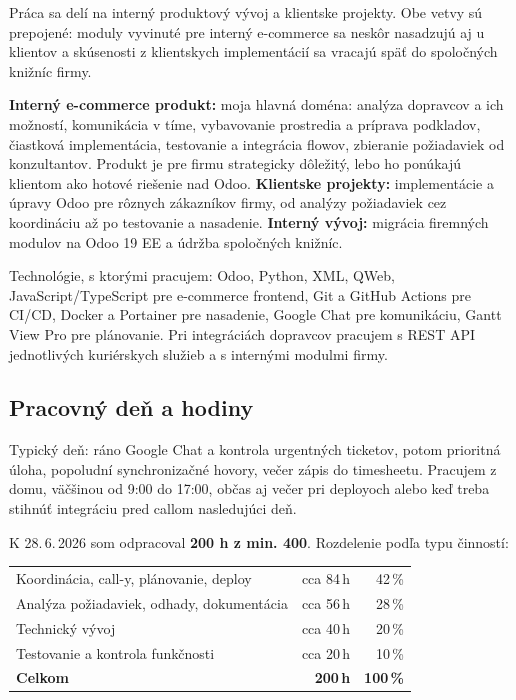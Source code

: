 \documentclass[12pt,a4paper]{article}
\begin{document}
Práca sa delí na interný produktový vývoj a klientske projekty. Obe vetvy sú prepojené: moduly vyvinuté pre interný e-commerce sa neskôr nasadzujú aj u klientov a skúsenosti z klientskych implementácií sa vracajú späť do spoločných knižníc firmy.

\textbf{Interný e-commerce produkt:} moja hlavná doména: analýza dopravcov a ich možností, komunikácia v tíme, vybavovanie prostredia a príprava podkladov, čiastková implementácia, testovanie a integrácia flowov, zbieranie požiadaviek od konzultantov. Produkt je pre firmu strategicky dôležitý, lebo ho ponúkajú klientom ako hotové riešenie nad Odoo. \textbf{Klientske projekty:} implementácie a úpravy Odoo pre rôznych zákazníkov firmy, od analýzy požiadaviek cez koordináciu až po testovanie a nasadenie. \textbf{Interný vývoj:} migrácia firemných modulov na Odoo 19 EE a údržba spoločných knižníc.

Technológie, s ktorými pracujem: Odoo, Python, XML, QWeb, JavaScript/TypeScript pre e-commerce frontend, Git a GitHub Actions pre CI/CD, Docker a Portainer pre nasadenie, Google Chat pre komunikáciu, Gantt View Pro pre plánovanie. Pri integráciách dopravcov pracujem s REST API jednotlivých kuriérskych služieb a s internými modulmi firmy.

\subsection{Pracovný deň a hodiny}

Typický deň: ráno Google Chat a kontrola urgentných ticketov, potom prioritná úloha, popoludní synchronizačné hovory, večer zápis do timesheetu. Pracujem z domu, väčšinou od 9:00 do 17:00, občas aj večer pri deployoch alebo keď treba stihnúť integráciu pred callom nasledujúci deň.

K 28.\,6.\,2026 som odpracoval \textbf{200 h z min. 400}. Rozdelenie podľa typu činností:

\begin{center}
\small
\begin{tabular}{|l|r|r|}
    \hline
    Koordinácia, call-y, plánovanie, deploy & cca 84\,h & 42\,\% \\
    Analýza požiadaviek, odhady, dokumentácia & cca 56\,h & 28\,\% \\
    Technický vývoj & cca 40\,h & 20\,\% \\
    Testovanie a kontrola funkčnosti & cca 20\,h & 10\,\% \\
    \hline
    \textbf{Celkom} & \textbf{200\,h} & \textbf{100\,\%} \\
    \hline
\end{tabular}
\end{center}
\end{document}
